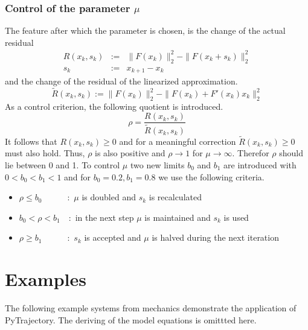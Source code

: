 \documentclass[letterpaper,10pt,english]{sphinxmanual}
\begin{document}
\subsubsection{Control of the parameter \(\mu\)}
\label{guide/background:control-of-the-parameter}
The feature after which the parameter is chosen, is the change of the actual residual
\begin{eqnarray*}
   R(x_k, s_k) & := & \| F(x_k) \|_2^2 - \| F(x_k + s_k) \|_2^2 \\
   s_k         & := & x_{k+1} - x_k
\end{eqnarray*}
and the change of the residual of the linearized approximation.
\begin{equation*}
   \tilde{R}(x_k, s_k) := \| F(x_k) \|_2^2 - \| F(x_k) + F'(x_k)x_k \|_2^2
\end{equation*}
As a control criterion, the following quotient is introduced.
\begin{equation*}
   \rho = \frac{R(x_k, s_k)}{\tilde{R}(x_k, s_k)}
\end{equation*}
It follows that \(R(x_k,s_k) \geq 0\) and for a meaningful correction \(\tilde{R}(x_k, s_k) \geq 0\) must also hold.
Thus, \(\rho\) is also positive and \(\rho \rightarrow 1\) for \(\mu \rightarrow \infty\).
Therefor \(\rho\) should lie between 0 and 1. To control \(\mu\) two new limits \(b_0\) and \(b_1\) are introduced
with \(0 < b_0 < b_1 < 1\) and for \(b_0 = 0.2, b_1 = 0.8\) we use the following criteria.
\begin{itemize}
\item {} 
\(\rho \leq b_0 \qquad\quad :\) \(\mu\) is doubled and \(s_k\) is recalculated

\item {} 
\(b_0 < \rho < b_1 \quad :\) in the next step \(\mu\) is maintained and \(s_k\) is used

\item {} 
\(\rho \geq b_1 \qquad\quad :\) \(s_k\) is accepted and \(\mu\) is halved during the next iteration

\end{itemize}


\section{Examples}
\label{guide/examples/index::doc}\label{guide/examples/index:examples}\label{guide/examples/index:id1}
The following example systems from mechanics demonstrate the application
of PyTrajectory. The deriving of the model equations is omittted here.
\end{document}
